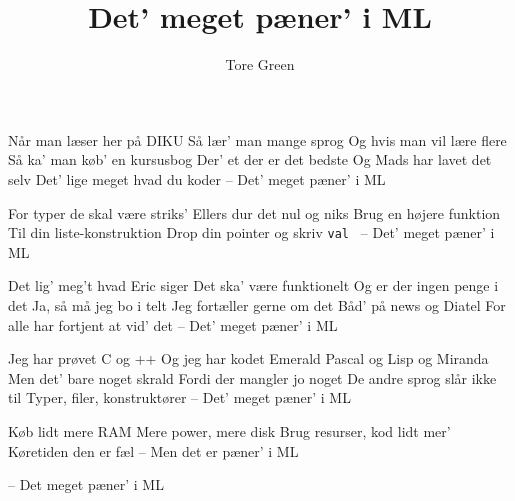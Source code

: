 \documentclass[10pt]{article}
\title{Det' meget pæner' i ML}
\author{Tore Green}
\begin{document}
\twocolumn[ %
\maketitle
]
\begin{song}
  Når man læser her på DIKU
            Så lær' man mange sprog
            Og hvis man vil lære flere
            Så ka' man køb' en kursusbog
            Der' et der er det bedste
            Og Mads har lavet det selv
            Det' lige meget hvad du koder
            -- Det' meget pæner' i ML

 For typer de skal være striks'
            Ellers dur det nul og niks
            Brug en højere funktion
            Til din liste-konstruktion
            Drop din pointer og skriv {\tt val }
            -- Det' meget pæner' i ML

  Det lig' meg't hvad Eric siger
            Det ska' være funktionelt
            Og er der ingen penge i det
            Ja, så må jeg bo i telt
            Jeg fortæller gerne om det
            Båd' på news og Diatel
            For alle har fortjent at vid' det
            -- Det' meget pæner' i ML


  Jeg har prøvet C og ++
            Og jeg har kodet Emerald
            Pascal og Lisp og Miranda
            Men det' bare noget skrald
            Fordi der mangler jo noget
            De andre sprog slår ikke til
            Typer, filer, konstruktører
            -- Det' meget pæner' i ML

 Køb lidt mere RAM
            Mere power, mere disk
            Brug resurser, kod lidt mer'
            Køretiden den er fæl
            -- Men det er pæner' i ML


 -- Det meget pæner' i ML 

\end{song}
\end{document}

